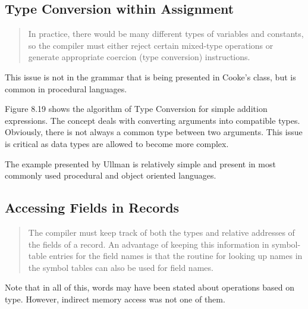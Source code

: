 \subsection {Type Conversion within Assignment}
\begin{quote}
In practice, there would be many different types of variables and constants, so the compiler must either reject certain mixed-type operations or generate appropriate coercion (type conversion) instructions.  
\end{quote}
This issue is not in the grammar that is being presented in Cooke's class, but is common in procedural languages.  

Figure 8.19 shows the algorithm of Type Conversion for simple addition expressions.   The concept deals with converting arguments into compatible types.  Obviously, there is not always a common type between two arguments.   This issue is critical as data types are allowed to become more complex.    

The example presented by Ullman is relatively simple and present in most commonly used procedural and object oriented languages.  


\subsection {Accessing Fields in Records}
\begin{quote}
The compiler must keep track of both the types and relative addresses of the fields of a record.  An advantage of keeping this information in symbol-table entries for the field names is that the routine for looking up names in the symbol tables can also be used for field names.  
\end{quote}



Note that in all of this, words may have been stated about operations based on type.  However, indirect memory access was not one of them.  